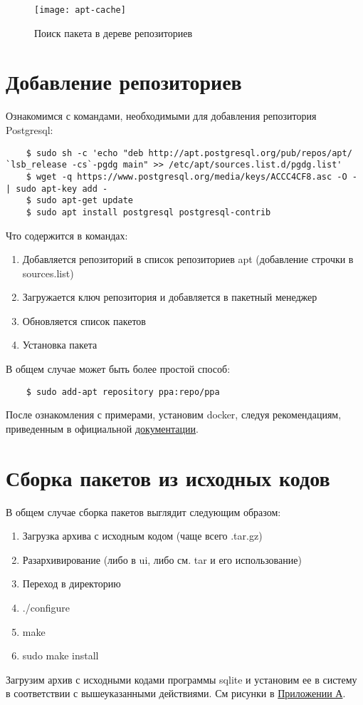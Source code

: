 \documentclass[a4paper,14pt]{extarticle}
\begin{document}
\begin{figure}[h!]
	\centering
	\texttt{[image: apt-cache]}
	\caption{Поиск пакета в дереве репозиториев}
	\label{img:apt-cache}
\end{figure}

\section{Добавление репозиториев}
Ознакомимся с командами, необходимыми для добавления репозитория Postgresql:
\begin{lstlisting}
	$ sudo sh -c 'echo "deb http://apt.postgresql.org/pub/repos/apt/ `lsb_release -cs`-pgdg main" >> /etc/apt/sources.list.d/pgdg.list'
	$ wget -q https://www.postgresql.org/media/keys/ACCC4CF8.asc -O - | sudo apt-key add -
	$ sudo apt-get update
	$ sudo apt install postgresql postgresql-contrib
\end{lstlisting}
Что содержится в командах:
\begin{enumerate}
	\item Добавляется репозиторий в список репозиториев apt (добавление строчки в sources.list)
	\item Загружается ключ репозитория и добавляется в пакетный менеджер
	\item Обновляется список пакетов
	\item Установка пакета
\end{enumerate}
В общем случае может быть более простой способ:
\begin{lstlisting}
	$ sudo add-apt repository ppa:repo/ppa
\end{lstlisting}
После ознакомления с примерами, установим docker, следуя рекомендациям, приведенным в официальной \href{https://docs.docker.com/engine/install/debian/}{документации}.
\newpage
\section{Сборка пакетов из исходных кодов}
В общем случае сборка пакетов выглядит следующим образом:
\begin{enumerate}
	\item Загрузка архива с исходным кодом (чаще всего .tar.gz)
	\item Разархивирование (либо в ui, либо см. tar и его использование)
	\item  Переход в директорию
	\item ./configure
	\item make
	\item sudo make install
\end{enumerate}
Загрузим архив с исходными кодами программы sqlite и установим ее в систему в соответствии с вышеуказанными действиями. См рисунки в \hyperref[A]{Приложении А}.
\end{document}
